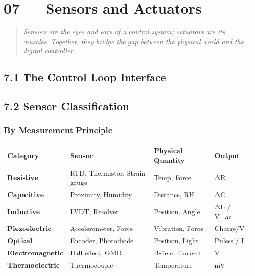 \documentclass[11pt,a4paper]{book}
\begin{document}
\section{07 — Sensors and Actuators}

\begin{quote}
\textit{Sensors are the eyes and ears of a control system; actuators are its muscles. Together, they bridge the gap between the physical world and the digital controller.}
\end{quote}

\medskip\noindent\hrulefill\medskip

\subsection{7.1 The Control Loop Interface}

\medskip\noindent\hrulefill\medskip

\subsection{7.2 Sensor Classification}

\subsubsection{By Measurement Principle}

\begin{center}
\begin{tabular}{|l|l|l|l|}
\hline
Category & Sensor & Physical Quantity & Output \\
\hline
\textbf{Resistive} & RTD, Thermistor, Strain gauge & Temp, Force & ΔR \\
\textbf{Capacitive} & Proximity, Humidity & Distance, RH & ΔC \\
\textbf{Inductive} & LVDT, Resolver & Position, Angle & ΔL / V_ac \\
\textbf{Piezoelectric} & Accelerometer, Force & Vibration, Force & Charge/V \\
\textbf{Optical} & Encoder, Photodiode & Position, Light & Pulses / I \\
\textbf{Electromagnetic} & Hall effect, GMR & B-field, Current & V \\
\textbf{Thermoelectric} & Thermocouple & Temperature & mV \\
\hline
\end{tabular}
\end{center}
\end{document}

